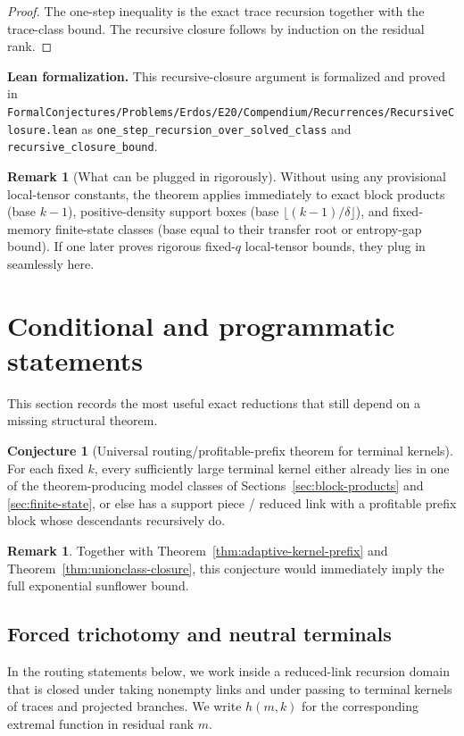 \documentclass[11pt]{article}
\theoremstyle{definition}
\newtheorem{conjecture}[theorem]{Conjecture}
\newtheorem{remark}[theorem]{Remark}
\newcommand{\1}{\mathbf{1}}
\newcommand{\leannote}[1]{\par\smallskip\noindent\textbf{Lean formalization.} #1\par\smallskip}
\begin{document}
\begin{proof}
The one-step inequality is the exact trace recursion together with the trace-class bound. The recursive closure follows by induction on the residual rank.
\end{proof}

\leannote{This recursive-closure argument is formalized and proved in \texttt{FormalConjectures/Problems/Erdos/E20/Compendium/Recurrences/RecursiveClosure.lean} as \texttt{one\_step\_recursion\_over\_solved\_class} and \texttt{recursive\_closure\_bound}.}

\begin{remark}[What can be plugged in rigorously]
Without using any provisional local-tensor constants, the theorem applies immediately to exact block products (base $k-1$), positive-density support boxes (base $\lfloor (k-1)/\delta\rfloor$), and fixed-memory finite-state classes (base equal to their transfer root or entropy-gap bound). If one later proves rigorous fixed-$q$ local-tensor bounds, they plug in seamlessly here.
\end{remark}

\section{Conditional and programmatic statements}\label{sec:conditional}
This section records the most useful exact reductions that still depend on a missing structural theorem.

\begin{conjecture}[Universal routing/profitable-prefix theorem for terminal kernels]
For each fixed $k$, every sufficiently large terminal kernel either already lies in one of the theorem-producing model classes of Sections~\ref{sec:block-products} and \ref{sec:finite-state}, or else has a support piece / reduced link with a profitable prefix block whose descendants recursively do.
\end{conjecture}

\begin{remark}
Together with Theorem~\ref{thm:adaptive-kernel-prefix} and Theorem~\ref{thm:unionclass-closure}, this conjecture would immediately imply the full exponential sunflower bound.
\end{remark}

\subsection*{Forced trichotomy and neutral terminals}
In the routing statements below, we work inside a reduced-link recursion domain that is closed under taking nonempty links and under passing to terminal kernels of traces and projected branches. We write $h(m,k)$ for the corresponding extremal function in residual rank $m$.
\end{document}
